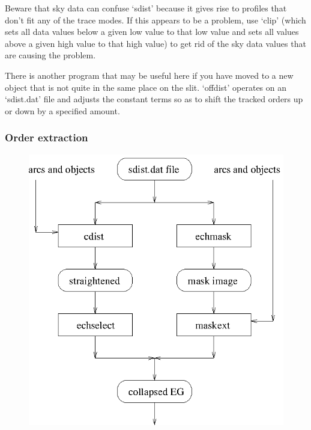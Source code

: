    Beware that sky data can confuse `sdist' because it gives rise to
   profiles that don't fit any of the trace modes. If this appears to be
   a problem, use `clip' (which sets all data values below a given low
   value to that low value and sets all values above a given high value
   to that high value) to get rid of the sky data values that are
   causing the problem.

   There is another program that may be useful here if you have moved
   to a new object that is not quite in the same place on the slit.
   `offdist' operates on an `sdist.dat' file and adjusts the constant
   terms so as to shift the tracked orders up or down by a specified
   amount.


\subsubsection{\label{techno13extract}Order extraction}

\begin{latexonly}
\begin{figure}[htb]
\begin{center}
\includegraphics{sun86_ech3.eps}
\end{center}
\end{figure}
\end{latexonly}

